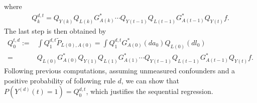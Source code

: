 \documentclass{article}
\newcommand{\A}[1]{A(#1)}
\renewcommand{\L}[1]{L(#1)}
\newcommand{\Y}[1]{Y(#1)}
\newcommand{\Ystar}[2]{Y^{(#1)}(#2)}
\begin{document}
    where
    \begin{align*}
        Q_k^{d,t}=Q_{\Y{k}}Q_{\L{k}}G^*_{\A{k}}\cdots Q_{\Y{t-1}}Q_{\L{t-1}}G^*_{\A{t-1}}Q_{\Y{t}}f.
    \end{align*}
    The last step is then obtained by 
    \begin{align*}
        Q_0^{t,d}:=&\int Q_1^{d,t}\tilde{P}_{\L{0},\A{0}}=\int Q_1^{d,t}G^*_{\A{0}}(da_0)Q_{\L{0}}(dl_0)\\
        =&Q_{\L{0}}G^*_{\A{0}}Q_{\Y{1}}Q_{\L{1}}G^*_{\A{1}}\cdots Q_{\Y{t-1}}Q_{\L{t-1}}G^*_{\A{t-1}}Q_{\Y{t}}f.
    \end{align*}
    Following previous computations, assuming unmeasured confounders and a positive probability of following rule $d$, we can show that $P(\Ystar{d}{t}=1)=Q_0^{d,t}$, which justifies the sequential regression.
\end{document}
